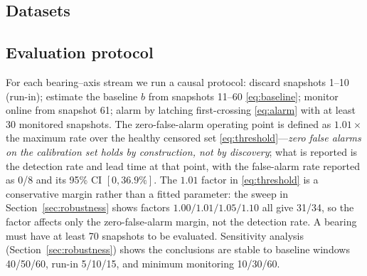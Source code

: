 \documentclass[journal]{IEEEtran}
\begin{document}
\subsection{Datasets}


\subsection{Evaluation protocol}
For each bearing--axis stream we run a causal protocol: discard snapshots 1--10 (run-in); estimate the baseline $b$ from snapshots 11--60 \eqref{eq:baseline}; monitor online from snapshot 61; alarm by latching first-crossing \eqref{eq:alarm} with at least 30 monitored snapshots. The zero-false-alarm operating point is defined as $1.01\times$ the maximum rate over the healthy censored set \eqref{eq:threshold}---\emph{zero false alarms on the calibration set holds by construction, not by discovery}; what is reported is the detection rate and lead time at that point, with the false-alarm rate reported as 0/8 and its 95\% CI $[0,36.9\%]$. The $1.01$ factor in \eqref{eq:threshold} is a conservative margin rather than a fitted parameter: the sweep in Section~\ref{sec:robustness} shows factors $1.00/1.01/1.05/1.10$ all give 31/34, so the factor affects only the zero-false-alarm margin, not the detection rate. A bearing must have at least 70 snapshots to be evaluated. Sensitivity analysis (Section~\ref{sec:robustness}) shows the conclusions are stable to baseline windows 40/50/60, run-in 5/10/15, and minimum monitoring 10/30/60.
\end{document}
